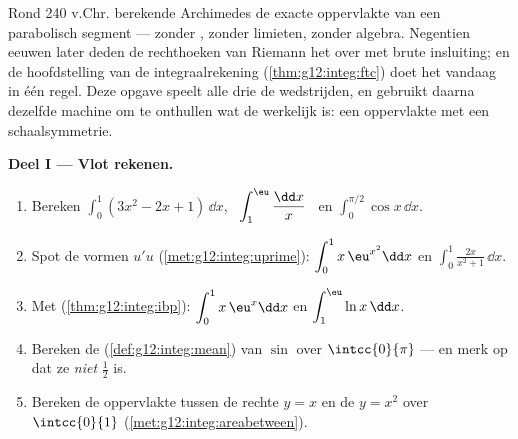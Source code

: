 \begin{problem}
\label{pb:g12:integ:1}
Rond 240 v.Chr. berekende Archimedes de exacte oppervlakte van een
parabolisch segment --- zonder , zonder limieten, zonder algebra.
Negentien eeuwen later deden de rechthoeken van Riemann het over met brute
insluiting; en de hoofdstelling van de integraalrekening
(\cref{thm:g12:integ:ftc}) doet het vandaag in één regel. Deze opgave speelt
alle drie de wedstrijden, en gebruikt daarna dezelfde machine om te onthullen
wat de  werkelijk is: een oppervlakte met een schaalsymmetrie.

\medskip
\noindent\textbf{Deel I --- Vlot rekenen.}
\begin{enumerate}
  \item Bereken $\displaystyle\int_0^1 (3x^2 - 2x + 1)\,\dd x$, \
        $\displaystyle\int_1^{\eu} \frac{\dd x}{x}$ \ en
        $\displaystyle\int_0^{\pi/2} \cos x\,\dd x$.
  \item Spot de vormen $u'u$ (\cref{met:g12:integ:uprime}):
        $\displaystyle\int_0^1 x\,\eu^{x^2}\dd x$ en
        $\displaystyle\int_0^1 \frac{2x}{x^2 + 1}\,\dd x$.
  \item Met  (\cref{thm:g12:integ:ibp}):
        $\displaystyle\int_0^1 x\,\eu^x \dd x$ en
        $\displaystyle\int_1^{\eu} \ln x\,\dd x$.
  \item Bereken de  (\cref{def:g12:integ:mean}) van $\sin$
        over $\intcc{0}{\pi}$ --- en merk op dat ze \emph{niet} $\frac12$ is.
  \item Bereken de oppervlakte tussen de rechte $y = x$ en de 
        $y = x^2$ over $\intcc{0}{1}$ (\cref{met:g12:integ:areabetween}).
\end{enumerate}


\end{problem}
